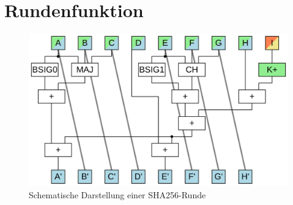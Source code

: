\section{Rundenfunktion}
\label{sec:sha256:runde}


\begin{figure}[!h]
  \centering
  \includegraphics[scale=0.4]{images/sha256core}
  \caption{Schematische Darstellung einer SHA256-Runde}
  \label{fig:sha256core}
\end{figure}